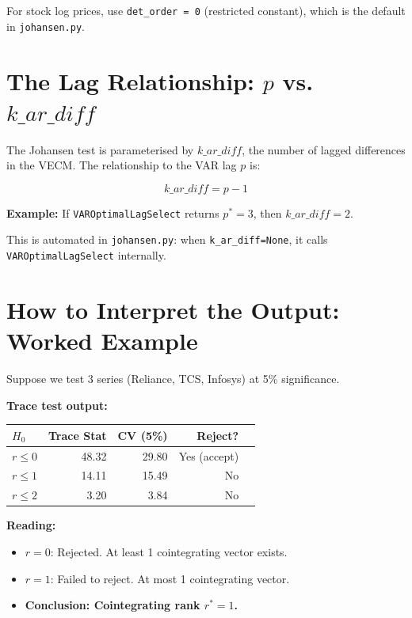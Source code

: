 \documentclass[12pt, a4paper]{article}
\begin{document}
For stock log prices, use \texttt{det\_order = 0} (restricted constant), which is the default 
in \texttt{johansen.py}.

\section{The Lag Relationship: $p$ vs. $k\_ar\_diff$}

The Johansen test is parameterised by $k\_ar\_diff$, the number of lagged differences in the VECM.
The relationship to the VAR lag $p$ is:

\begin{equation}
    k\_ar\_diff = p - 1
\end{equation}

\textbf{Example:} If \texttt{VAROptimalLagSelect} returns $p^* = 3$, then $k\_ar\_diff = 2$.

This is automated in \texttt{johansen.py}: when \texttt{k\_ar\_diff=None}, it calls 
\texttt{VAROptimalLagSelect} internally.

\section{How to Interpret the Output: Worked Example}

Suppose we test 3 series (Reliance, TCS, Infosys) at 5\% significance.

\medskip
\textbf{Trace test output:}

\begin{center}
\begin{tabular}{@{}lrrrl@{}}
\toprule
$H_0$ & Trace Stat & CV (5\%) & Reject? \\
\midrule
$r \leq 0$ & 48.32 & 29.80 & Yes (accept) \\
$r \leq 1$ & 14.11 & 15.49 & No   \\
$r \leq 2$ &  3.20 &  3.84 & No   \\
\bottomrule
\end{tabular}
\end{center}

\textbf{Reading:}
\begin{itemize}
    \item $r = 0$: Rejected. At least 1 cointegrating vector exists.
    \item $r = 1$: Failed to reject. At most 1 cointegrating vector.
    \item \textbf{Conclusion: Cointegrating rank $r^* = 1$.}
\end{itemize}
\end{document}
